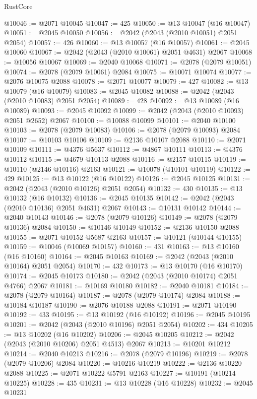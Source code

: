 \begin{lexlean}{RustCore}
\begin{coremodule}
@10046 := @2071 @10045
@10047 := 425
@10050 := @13 @10047 (@16 @10047)
@10051 := @2045 @10050
@10056 := @2042 (@2043 (@2010 @10051) @2051 @2054)
@10057 := 426
@10060 := @13 @10057 (@16 @10057)
@10061 := @2045 @10060
@10067 := @2042 (@2043 (@2010 @10061) @2051 @4631) @2067
@10068 := @10056 @10067
@10069 := @2040 @10068
@10071 := @2078 (@2079 @10051)
@10074 := @2078 (@2079 @10061) @2084
@10075 := @10071 @10074
@10077 := @2076 @10075 @2088
@10078 := @2071 @10077
@10079 := 427
@10082 := @13 @10079 (@16 @10079)
@10083 := @2045 @10082
@10088 := @2042 (@2043 (@2010 @10083) @2051 @2054)
@10089 := 428
@10092 := @13 @10089 (@16 @10089)
@10093 := @2045 @10092
@10099 := @2042 (@2043 (@2010 @10093) @2051 @2652) @2067
@10100 := @10088 @10099
@10101 := @2040 @10100
@10103 := @2078 (@2079 @10083)
@10106 := @2078 (@2079 @10093) @2084
@10107 := @10103 @10106
@10109 := @2136 @10107 @2088
@10110 := @2071 @10109
@10111 := @4376 @5637
@10112 := @4867 @10111
@10113 := @4376 @10112
@10115 := @4679 @10113 @2088
@10116 := @2157 @10115
@10119 := @10110 (@2146 @10116) @2163
@10121 := @10078 (@10101 @10119)
@10122 := 429
@10125 := @13 @10122 (@16 @10122)
@10126 := @2045 @10125
@10131 := @2042 (@2043 (@2010 @10126) @2051 @2054)
@10132 := 430
@10135 := @13 @10132 (@16 @10132)
@10136 := @2045 @10135
@10142 := @2042 (@2043 (@2010 @10136) @2051 @4631) @2067
@10143 := @10131 @10142
@10144 := @2040 @10143
@10146 := @2078 (@2079 @10126)
@10149 := @2078 (@2079 @10136) @2084
@10150 := @10146 @10149
@10152 := @2136 @10150 @2088
@10155 := @2071 @10152 @5687 @2163
@10157 := @10121 (@10144 @10155)
@10159 := @10046 (@10069 @10157)
@10160 := 431
@10163 := @13 @10160 (@16 @10160)
@10164 := @2045 @10163
@10169 := @2042 (@2043 (@2010 @10164) @2051 @2054)
@10170 := 432
@10173 := @13 @10170 (@16 @10170)
@10174 := @2045 @10173
@10180 := @2042 (@2043 (@2010 @10174) @2051 @4766) @2067
@10181 := @10169 @10180
@10182 := @2040 @10181
@10184 := @2078 (@2079 @10164)
@10187 := @2078 (@2079 @10174) @2084
@10188 := @10184 @10187
@10190 := @2076 @10188 @2088
@10191 := @2071 @10190
@10192 := 433
@10195 := @13 @10192 (@16 @10192)
@10196 := @2045 @10195
@10201 := @2042 (@2043 (@2010 @10196) @2051 @2054)
@10202 := 434
@10205 := @13 @10202 (@16 @10202)
@10206 := @2045 @10205
@10212 := @2042 (@2043 (@2010 @10206) @2051 @4513) @2067
@10213 := @10201 @10212
@10214 := @2040 @10213
@10216 := @2078 (@2079 @10196)
@10219 := @2078 (@2079 @10206) @2084
@10220 := @10216 @10219
@10222 := @2136 @10220 @2088
@10225 := @2071 @10222 @5791 @2163
@10227 := @10191 (@10214 @10225)
@10228 := 435
@10231 := @13 @10228 (@16 @10228)
@10232 := @2045 @10231

\end{coremodule}
\end{lexlean}
